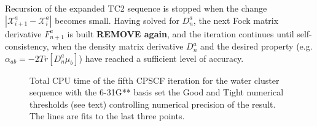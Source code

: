 \documentclass[prl,aps,twocolumn,showpacs,twocolumngrid,superbib]{revtex4}
\begin{document}
Recursion of the expanded TC2 sequence is stopped when the change 
$\left| \mathcal{X}^a_{i+1}-\mathcal{X}^a_i \right|$ becomes small. Having solved for $D^a_n$, 
the next Fock matrix derivative $F^a_{n+1}$ is built {\bf REMOVE again}, 
and the iteration continues until self-consistency, when the density matrix derivative
$D^a_n$ and the desired property (e.g. $\alpha_{ab}=-2Tr[D^a_n\mu_b]$) have reached a sufficient 
level of accuracy.

\begin{figure}[t]
\label{fig:Alpha_h2o3D_6-31G_6-31Gss_G_T_t}
\caption{\protect  Total CPU time of the fifth CPSCF iteration for the water cluster sequence with 
         the 6-31G** basis set the Good and Tight numerical thresholds (see text) 
         controlling numerical precision of the result.  The lines are fits to the last three points.}
\end{figure}
\end{document}
